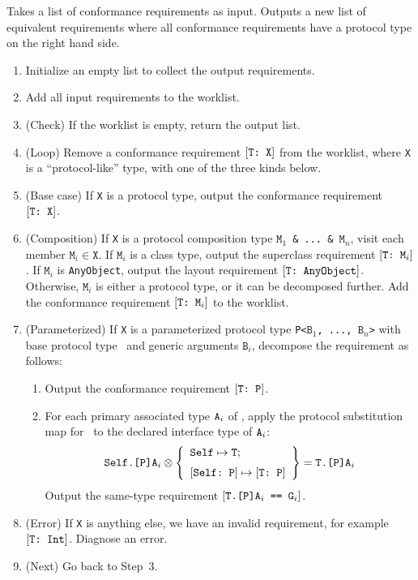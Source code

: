 \documentclass[../generics]{subfiles}
\begin{document}
\begin{algorithm}\label{expand conformance req algorithm} Takes a list of conformance requirements as input. Outputs a new list of equivalent requirements where all conformance requirements have a protocol type on the right hand side.
\begin{enumerate}
\item Initialize an empty list to collect the output requirements.
\item Add all input requirements to the worklist.
\item (Check) If the worklist is empty, return the output list.
\item (Loop) Remove a conformance requirement $[\texttt{T:~X}]$ from the worklist, where \texttt{X} is a ``protocol-like'' type, with one of the three kinds below.
\item (Base case) If \texttt{X} is a protocol type, output the conformance requirement $[\texttt{T:~X}]$.
\item (Composition) If \texttt{X} is a protocol composition type \texttt{$\texttt{M}_1$ \& ...~\& $\texttt{M}_n$}, visit each member $\texttt{M}_i\in\texttt{X}$. If $\texttt{M}_i$ is a class type, output the superclass requirement $[\texttt{T:~$\texttt{M}_i$}]$. If $\texttt{M}_i$ is \texttt{AnyObject}, output the layout requirement $[\texttt{T:~AnyObject}]$. Otherwise, $\texttt{M}_i$ is either a protocol type, or it can be decomposed further. Add the conformance requirement $[\texttt{T:~$\texttt{M}_i$}]$ to the worklist.
\item (Parameterized) If \texttt{X} is a parameterized protocol type \texttt{P<$\texttt{B}_1$, ..., $\texttt{B}_n$>} with base protocol type \tP\ and generic arguments $\texttt{B}_i$, decompose the requirement as follows:
\begin{enumerate}
\item Output the conformance requirement $[\texttt{T:~P}]$.
\item For each primary associated type $\texttt{A}_i$ of \tP, apply the protocol substitution map for \tT\ to the declared interface type of $\texttt{A}_i$:
\[\texttt{Self.[P]A}_i \otimes \SubstMapLongC{\SubstType{Self}{T}}{\SubstConf{Self}{T}{P}} = \texttt{T.[P]A}_i\]
Output the same-type requirement $[\texttt{$\texttt{T.[P]A}_i$ == $\texttt{G}_i$}]$.
\end{enumerate}
\item (Error) If \texttt{X} is anything else, we have an invalid requirement, for example $[\texttt{T:~Int}]$. Diagnose an error.
\item (Next) Go back to Step~3.
\end{enumerate}
\end{algorithm}
\end{document}
